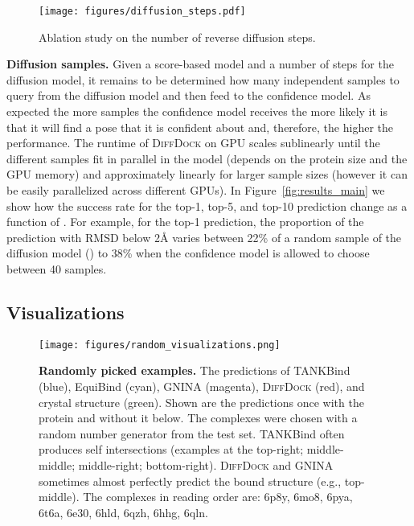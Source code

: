 \documentclass{article} \usepackage{iclr2023_conference,times}
\begin{document}
\begin{figure}[t]
    \centering
    \texttt{[image: figures/diffusion\_steps.pdf]}
    \caption{ Ablation study on the number of reverse diffusion steps. }
    \label{fig:diffusion_steps}
\end{figure}



\textbf{Diffusion samples. } Given a score-based model and a number of steps for the diffusion model, it remains to be determined how many independent samples  to query from the diffusion model and then feed to the confidence model. As expected the more samples the confidence model receives the more likely it is that it will find a pose that it is confident about and, therefore, the higher the performance. The runtime of \textsc{DiffDock} on GPU scales sublinearly until the different samples fit in parallel in the model (depends on the protein size and the GPU memory) and approximately linearly for larger sample sizes (however it can be easily parallelized across different GPUs). In Figure~\ref{fig:results_main} we show how the success rate for the top-1, top-5, and top-10 prediction change as a function of . For example, for the top-1 prediction, the proportion of the prediction with RMSD below 2\AA{} varies between 22\% of a random sample of the diffusion model () to 38\% when the confidence model is allowed to choose between 40 samples.


\clearpage
\subsection{Visualizations}

\begin{figure}[htb]
    \centering
    \texttt{[image: figures/random\_visualizations.png]}
    \caption{\textbf{Randomly picked examples.} The predictions of TANKBind (blue), EquiBind (cyan), GNINA (magenta), \textsc{DiffDock} (red), and crystal structure (green). Shown are the predictions once with the protein and without it below. The complexes were chosen with a random number generator from the test set. TANKBind often produces self intersections (examples at the top-right; middle-middle; middle-right; bottom-right). \textsc{DiffDock} and GNINA sometimes almost perfectly predict the bound structure (e.g., top-middle). The complexes in reading order are: 6p8y, 6mo8, 6pya, 6t6a, 6e30, 6hld, 6qzh, 6hhg, 6qln.}
    \label{fig:random_examples}
\end{figure}
\end{document}
